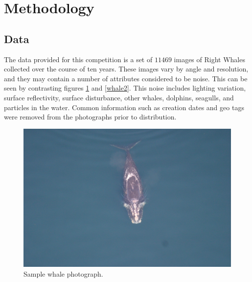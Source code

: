 \documentclass[10pt]{IEEEtran}
\newcommand{\?}{\stackrel{?}{=}}
\begin{document}
\section{Methodology}
\subsection{Data}
The data provided for this competition is a set of $11469$ images of Right 
Whales collected over the course of ten years\cite{kaggle_data}. These 
images vary by angle and resolution, and they may contain a number of attributes 
considered to be
noise. This can be seen by contrasting figures \ref{whale} and \ref{whale2}. 
This noise includes lighting variation, surface reflectivity, surface
disturbance, other whales, dolphins, seagulls, and particles in the water.
Common information such as creation dates and geo tags were removed from the 
photographs prior to distribution. 

\begin{figure}[H]
\begin{center}
\captionsetup{justification=centering}
\includegraphics[scale=.06]{whale.png}
\caption{Sample whale photograph.}
\label{whale}
\end{center}
\end{figure}
\end{document}
